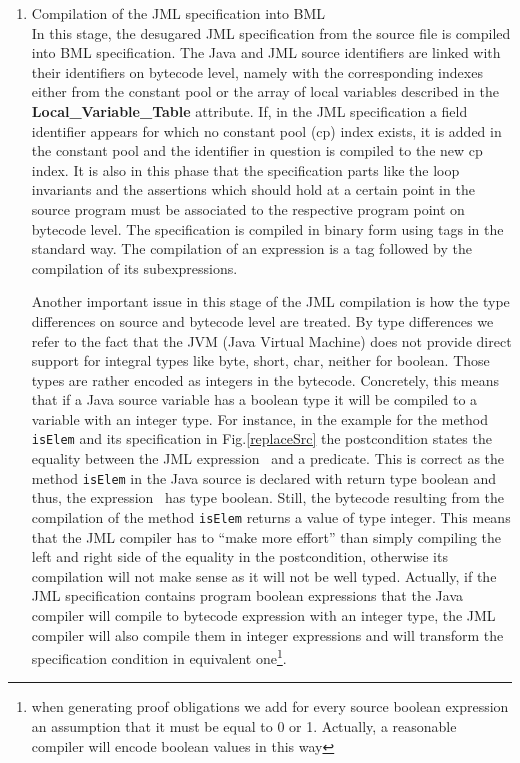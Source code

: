 \begin{enumerate}
      
\item Compilation of the JML specification into BML \\
   In this stage, the desugared JML specification from the source file is compiled into BML specification.
The Java and JML source identifiers are linked with their identifiers on bytecode level, namely with the corresponding indexes either from the constant pool or the array of 
local variables described in the \textbf{Local\_Variable\_Table} attribute. If, in the JML specification a field
identifier appears for which no constant pool (cp) index exists, it is added in the constant pool and the identifier in question
is compiled to the new cp index. It is also in this phase that the specification parts like the loop invariants and the assertions which should hold at a certain point in the source program must be associated to the respective program point on bytecode level. The specification
is compiled in binary form using tags in the standard way. The compilation of an expression is a tag followed by the compilation of its subexpressions. 


Another important issue in this stage of the JML compilation is how the type differences on source and bytecode level are treated. 
By type differences we refer to the fact that the JVM (Java Virtual Machine) does not provide direct support for integral types 
like byte, short, char, neither for boolean. Those types are rather encoded as integers in the bytecode. Concretely, this means that 
if a Java source variable has a boolean type it will be compiled to a variable with
an integer type. For instance, in the example for the method 
\texttt{isElem} and its specification in Fig.\ref{replaceSrc} the postcondition states the equality between the JML expression  
\result \ and a predicate. This is correct as the method \texttt{isElem} in the Java source is declared with return type boolean  and thus,
 the expression \result \ has type boolean. 
Still, the bytecode resulting from the compilation of the method  \texttt{isElem} returns a value of type integer. This means that the JML compiler has to 
``make more effort'' than simply compiling the left and right side of the equality in the postcondition, otherwise its compilation will not make sense as 
it will not be well typed. Actually, if the JML specification contains program boolean expressions that the Java compiler will compile to bytecode expression
 with an integer type, the JML compiler will also compile them in integer expressions and will transform the specification condition in equivalent 
one\footnote{when generating proof obligations we add for every source boolean expression an assumption that it
 must be equal to 0 or 1. Actually, a reasonable compiler will encode boolean values in this way}.  


\end{enumerate}

